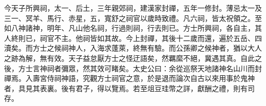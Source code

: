 \begin{pinyinscope}
今天子所興祠，太一、后土，三年親郊祠，建漢家封禪，五年一修封。薄忌太一及三一、冥羊、馬行、赤星，五，寬舒之祠官以歲時致禮。凡六祠，皆太祝領之。至如八神諸神，明年、凡山他名祠，行過則祠，行去則已。方士所興祠，各自主，其人終則已，祠官不主。他祠皆如其故。今上封禪，其後十二歲而還，遍於五岳、四瀆矣。而方士之候祠神人，入海求蓬萊，終無有驗。而公孫卿之候神者，猶以大人之跡為解，無有效。天子益怠厭方士之怪迂語矣，然羈縻不絕，冀遇其真。自此之後，方士言神祠者彌眾，然其效可睹矣。太史公曰：余從巡祭天地諸神名山川而封禪焉。入壽宮侍祠神語，究觀方士祠官之意，於是退而論次自古以來用事於鬼神者，具見其表裏。後有君子，得以覽焉。若至俎豆珪幣之詳，獻酬之禮，則有司存。


\end{pinyinscope}